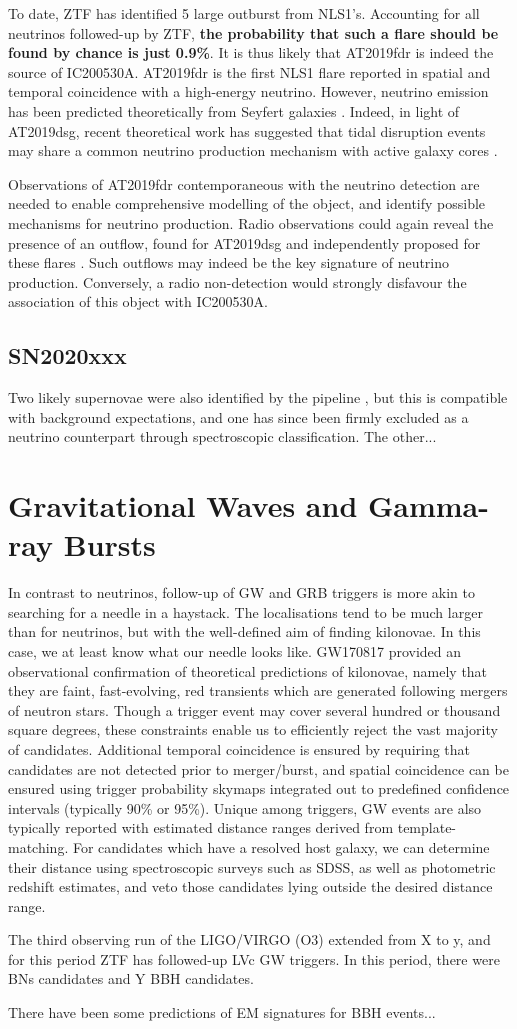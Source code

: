 To date, ZTF has identified 5 large outburst from NLS1's. Accounting for all neutrinos followed-up by ZTF, \textbf{the probability that such a flare should be found by chance is just 0.9\%}. It is thus likely that AT2019fdr is indeed the source of IC200530A. AT2019fdr is the first NLS1 flare reported in spatial and temporal coincidence with a high-energy neutrino. However, neutrino emission has been predicted theoretically from Seyfert galaxies \cite[see e.g][]{murase_agn}. Indeed, in light of AT2019dsg, recent theoretical work has suggested that tidal disruption events may share a common neutrino production mechanism with active galaxy cores . 

Observations of AT2019fdr contemporaneous with the neutrino detection are needed to enable comprehensive modelling of the object, and identify possible mechanisms for neutrino production. Radio observations could again reveal the presence of an outflow, found for AT2019dsg and independently proposed for these flares \cite{trakhtenbrot19}. Such outflows may indeed be the key signature of neutrino production. Conversely, a radio non-detection would strongly disfavour the association of this object with IC200530A.

\subsection{SN2020xxx}

Two likely supernovae were also identified by the pipeline \cite{ztf_IC200530A}, but this is compatible with background expectations, and one has since been firmly excluded as a neutrino counterpart through spectroscopic classification. The other...

\section{Gravitational Waves and Gamma-ray Bursts}
In contrast to neutrinos, follow-up of GW and GRB triggers is more akin to searching for a needle in a haystack. The localisations tend to be much larger than for neutrinos, but with the well-defined aim of finding kilonovae. In this case, we at least know what our needle looks like. GW170817 provided an observational confirmation of theoretical predictions of kilonovae, namely that they are faint, fast-evolving, red transients which are generated following mergers of neutron stars. Though a trigger event may cover several hundred or thousand square degrees, these constraints enable us to efficiently reject the vast majority of candidates. Additional temporal coincidence is ensured by requiring that candidates are not detected prior to merger/burst, and spatial coincidence can be ensured using trigger probability skymaps integrated out to predefined confidence intervals (typically 90\% or 95\%). Unique among triggers, GW events are also typically reported with estimated distance ranges derived from template-matching. For candidates which have a resolved host galaxy, we can determine their distance using spectroscopic surveys such as SDSS, as well as photometric redshift estimates, and veto those candidates lying outside the desired distance range.

The third observing run of the LIGO/VIRGO (O3) extended from X to y, and for this period ZTF has followed-up LVc GW triggers. In this period, there were BNs candidates and Y BBH candidates.

There have been some predictions of EM signatures for BBH events...
